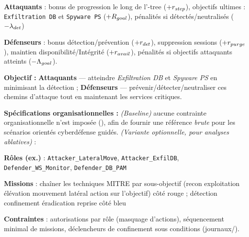 \begin{enumerate*}[label={\roman*)}, itemjoin={; \quad}]
  \begin{enumerate*}[label={\alph*)}, itemjoin={; \ }]
    \item \textbf{Attaquants} : bonus de progression le long de l’-tree ($+r_{\small step}$), objectifs ultimes : \texttt{Exfiltration DB} et \texttt{Spyware PS} ($+R_{\small goal}$), pénalités si détectés/neutralisés ($-\lambda_{\small det}$)
    \item \textbf{Défenseurs} : bonus détection/prévention ($+r_{\small det}$), suppression sessions ($+r_{\small purge}$), maintien disponibilité/Intégrité ($+r_{\small avail}$), pénalités si objectifs attaquants atteints ($-\Lambda_{\small goal}$).
  \end{enumerate*}
  \item \textbf{Objectif :} \textbf{Attaquants} — atteindre \emph{Exfiltration DB} et \emph{Spyware PS} en minimisant la détection ; \textbf{Défenseurs} — prévenir/détecter/neutraliser ces chemins d’attaque tout en maintenant les services critiques.
\end{enumerate*}

\medskip
\textbf{Spécifications organisationnelles :} \emph{(Baseline)} aucune contrainte organisationnelle n’est imposée (\texttt{}), afin de fournir une référence \emph{brute} pour les scénarios orientés cyberdéfense guidés. \emph{(Variante optionnelle, pour analyses ablatives)} :
\begin{enumerate*}[label={\roman*)}, itemjoin={; \quad}]
  \item \textbf{Rôles (ex.)} : \texttt{Attacker\_LateralMove}, \texttt{Attacker\_ExfilDB}, \texttt{Defender\_WS\_Monitor}, \texttt{Defender\_DB\_PAM}
  \item \textbf{Missions} : chaîner les techniques MITRE par sous-objectif (recon \textrightarrow{} exploitation \textrightarrow{} élévation \textrightarrow{} mouvement latéral \textrightarrow{} action sur l’objectif) côté rouge ; détection \textrightarrow{} confinement \textrightarrow{} éradication \textrightarrow{} reprise côté bleu
  \item \textbf{Contraintes} : autorisations par rôle (masquage d’actions), séquencement minimal de missions, déclencheurs de confinement sous conditions (journaux/).
\end{enumerate*}

